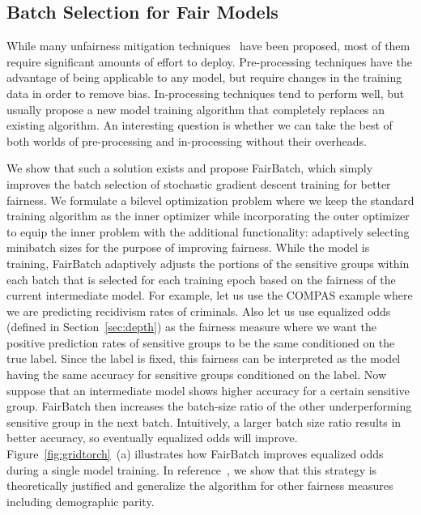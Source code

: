 \documentclass[11pt]{article}
\newcommand{\fb}{FairBatch}
\begin{document}
\newpage
\subsection{Batch Selection for Fair Models}

While many unfairness mitigation techniques~\cite{aif360-oct-2018} have been proposed, most of them require significant amounts of effort to deploy. Pre-processing techniques have the advantage of being applicable to any model, but require changes in the training data in order to remove bias. In-processing techniques tend to perform well, but usually propose a new model training algorithm that completely replaces an existing algorithm. An interesting question is whether we can take the best of both worlds of pre-processing and in-processing without their overheads. 

We show that such a solution exists and propose \fb{}, which simply improves the batch selection of stochastic gradient descent training for better fairness. We formulate a bilevel optimization problem where we keep the standard training algorithm as the inner optimizer while incorporating the outer optimizer to equip the inner problem with the additional functionality: adaptively selecting minibatch sizes for the purpose of improving fairness. While the model is training, \fb{} adaptively adjusts the portions of the sensitive groups within each batch that is selected for each training epoch based on the fairness of the current intermediate model. For example, let us use the COMPAS example where we are predicting recidivism rates of criminals. Also let us use equalized odds (defined in Section~\ref{sec:depth}) as the fairness measure where we want the positive prediction rates of sensitive groups to be the same conditioned on the true label. Since the label is fixed, this fairness can be interpreted as the model having the same accuracy for sensitive groups conditioned on the label. Now suppose that an intermediate model shows higher accuracy for a certain sensitive group. \fb{} then increases the batch-size ratio of the other underperforming sensitive group in the next batch. Intuitively, a larger batch size ratio results in better accuracy, so eventually equalized odds will improve. Figure~\ref{fig:gridtorch}~(a) illustrates how \fb{} improves equalized odds during a single model training. In reference~\cite{fairbatch}, we show that this strategy is theoretically justified and generalize the algorithm for other fairness measures including demographic parity.
\end{document}
